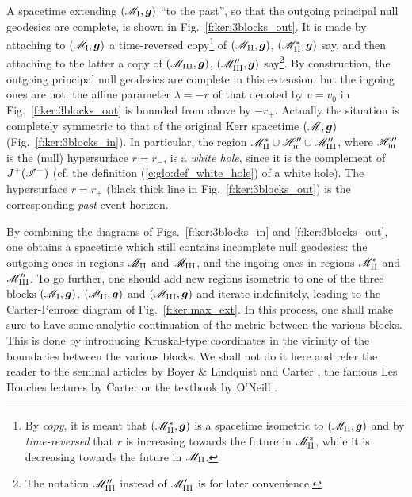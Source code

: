 A spacetime extending $(\mathscr{M}_{\rm I},\bm{g})$ ``to the past'', so that
the outgoing principal null geodesics are complete, is shown in
Fig.~\ref{f:ker:3blocks_out}. It is made by attaching to $(\mathscr{M}_{\rm I},\bm{g})$
a time-reversed copy\footnote{By \emph{copy}, it is meant
that $(\mathscr{M}_{\rm II}^*,\bm{g})$ is a spacetime isometric to $(\mathscr{M}_{\rm II},\bm{g})$
and by \emph{time-reversed} that $r$ is increasing towards
the future in $\mathscr{M}_{\rm II}^*$, while it is decreasing towards the future
in $\mathscr{M}_{\rm II}$.}
 of $(\mathscr{M}_{\rm II},\bm{g})$, $(\mathscr{M}_{\rm II}^*,\bm{g})$ say,
and then attaching to the latter a copy of $(\mathscr{M}_{\rm III},\bm{g})$, $(\mathscr{M}''_{\rm III},\bm{g})$ say\footnote{The notation
$\mathscr{M}''_{\rm III}$ instead of $\mathscr{M}'_{\rm III}$ is for later convenience.}.
By construction, the outgoing principal null geodesics are complete in this extension, but
the ingoing ones are not: the affine parameter $\lambda=-r$ of that
denoted by $v=v_0$ in Fig.~\ref{f:ker:3blocks_out} is bounded from above by $-r_+$. Actually the
situation is completely symmetric to that of the original Kerr
spacetime $(\mathscr{M},\bm{g})$ (Fig.~\ref{f:ker:3blocks_in}). In particular,
the region $\mathscr{M}_{\rm II}^*\cup\mathscr{H}''_{\rm in}\cup \mathscr{M}''_{\rm III}$, where
$\mathscr{H}''_{\rm in}$ is the (null) hypersurface $r=r_-$, is a
\emph{white hole},
since it is the complement of $J^+(\mathscr{I}^-)$ (cf. the definition (\ref{e:glo:def_white_hole})
of a white hole). The hypersurface $r=r_+$ (black thick line in  Fig.~\ref{f:ker:3blocks_out}) is the corresponding
\emph{past} event horizon.

By combining the diagrams of Figs.~\ref{f:ker:3blocks_in} and
\ref{f:ker:3blocks_out}, one obtains a spacetime which still
contains incomplete null geodesics: the outgoing ones in regions
$\mathscr{M}_{\rm II}$ and $\mathscr{M}_{\rm III}$, and the ingoing ones in regions
$\mathscr{M}_{\rm II}^*$ and $\mathscr{M}''_{\rm III}$. To go further, one should add
new regions isometric to one of the three blocks
$(\mathscr{M}_{\rm I},\bm{g})$, $(\mathscr{M}_{\rm II},\bm{g})$ and $(\mathscr{M}_{\rm III},\bm{g})$
and iterate indefinitely, leading to the
Carter-Penrose diagram of Fig.~\ref{f:ker:max_ext}.
In this process, one shall make sure to have some analytic continuation
of the metric between the various blocks. This is done by introducing
Kruskal-type coordinates in the vicinity of the boundaries between
the various blocks. We shall not do it here and refer the reader to
the seminal articles by Boyer \& Lindquist \cite{BoyerL67} and Carter \cite{Carte68a},
the famous Les Houches lectures by Carter \cite{Carte73a} or
the textbook by O'Neill \cite{ONeil95}.

